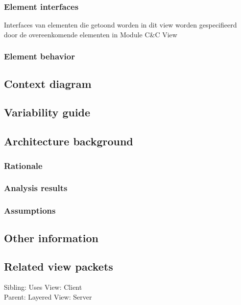 \documentclass[a4paper,10pt]{article}
\begin{document}
\subsubsection{Element interfaces}

Interfaces van elementen die getoond worden in dit view worden gespecifieerd door de overeenkomende elementen in Module C\&C View\\

\subsubsection{Element behavior}

\subsection{Context diagram}

\subsection{Variability guide}

\subsection{Architecture background}

\subsubsection{Rationale}

\subsubsection{Analysis results}

\subsubsection{Assumptions}

\subsection{Other information}

\subsection{Related view packets}

Sibling: Uses View: Client\\
Parent: Layered View: Server\\
\end{document}
